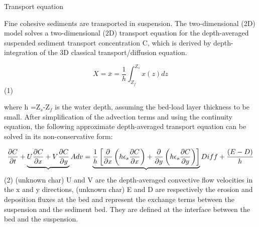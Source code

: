 Transport equation

Fine cohesive sediments are transported in suspension. The two-dimensional
(2D) model solves a two-dimensional (2D) transport equation for the
depth-averaged suspended sediment transport concentration C, which is
derived by depth-integration of the 3D classical transport/diffusion
equation.

\begin{equation*}
X=\overline{x} =\frac{1}{h} \int\nolimits_{Z_{f} }^{Z_{s} }x(z)dz 
\end{equation*}%
\hspace{5mm} \hspace{5mm} \hspace{5mm} (1)\hspace{5mm}

where h =Z$_{s}$-Z$_{f}$ is the water depth, assuming the bed-load layer
thickness to be small.\newline
After simplification of the advection terms and using the continuity
equation, the following approximate depth-averaged transport equation can be
solved in its non-conservative form:

\begin{equation*}
\frac{\partial C}{\partial t}+\underbrace{U\frac{\partial C}{\partial x}+V%
\frac{\partial C}{\partial y}}Adv=\underbrace{\frac{1}{h}\left[ \frac{%
\partial }{\partial x}\left( h\epsilon _{s}\frac{\partial C}{\partial x}%
\right) +\frac{\partial }{\partial y}\left( h\epsilon _{s}\frac{\partial C}{%
\partial y}\right) \right] }Diff+\frac{(E-D)}{h}
\end{equation*}%
\hspace{5mm} \hspace{5mm} (2)\hspace{5mm} \newline
(unknown char)\hspace{5mm} U and V are the depth-averaged convective flow
velocities in the x and y directions,\newline
(unknown char)\hspace{5mm} E and D are respectively the erosion and
deposition fluxes at the bed and represent the exchange terms between the
suspension and the sediment bed. They are defined at the interface between
the bed and the suspension.

